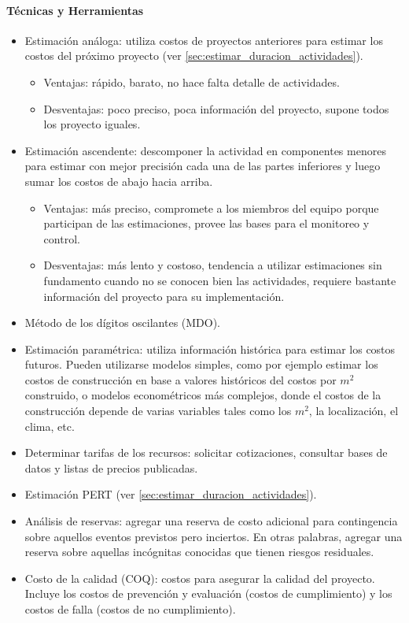 \documentclass[a4paper,twosides]{article}
\newlength{\wideitemsep}
\let\olditem\item
\renewcommand{\item}{\setlength{\itemsep}{\wideitemsep}\olditem}
\begin{document}
\paragraph{Técnicas y Herramientas}
\begin{itemize}
\item Estimación análoga: utiliza costos de proyectos anteriores para estimar los costos del próximo proyecto (ver \ref{sec:estimar_duracion_actividades}).
\begin{itemize}
\item Ventajas: rápido, barato, no hace falta detalle de actividades.
\item Desventajas: poco preciso, poca información del proyecto, supone todos los proyecto iguales.
\end{itemize}
\item Estimación ascendente: descomponer la actividad en componentes menores para estimar con mejor precisión cada una de las partes inferiores y luego sumar los costos de abajo hacia arriba.
\begin{itemize}
\item Ventajas: más preciso, compromete a los miembros del equipo porque participan de las estimaciones, provee las bases para el monitoreo y control.
\item Desventajas: más lento y costoso, tendencia a utilizar estimaciones sin fundamento cuando no se conocen bien las actividades, requiere bastante información del proyecto para su implementación.
\end{itemize}
\item Método de los dígitos oscilantes (MDO).
\item Estimación paramétrica: utiliza información histórica para estimar los costos futuros. Pueden utilizarse modelos simples, como por ejemplo estimar los costos de construcción en base a valores históricos del costos por $m^2$ construido, o modelos econométricos más complejos, donde el costos de la construcción depende de varias variables tales como los $m^2$, la localización, el clima, etc.
\item Determinar tarifas de los recursos: solicitar cotizaciones, consultar bases de datos y listas de precios publicadas.
\item Estimación PERT (ver \ref{sec:estimar_duracion_actividades}).
\item Análisis de reservas: agregar una reserva de costo adicional para contingencia sobre aquellos eventos previstos pero inciertos. En otras palabras, agregar una reserva sobre aquellas incógnitas conocidas que tienen riesgos residuales.
\item Costo de la calidad (COQ): costos para asegurar la calidad del proyecto. Incluye los costos de prevención y evaluación (costos de cumplimiento) y los costos de falla (costos de no cumplimiento).
\end{itemize}
\end{document}
